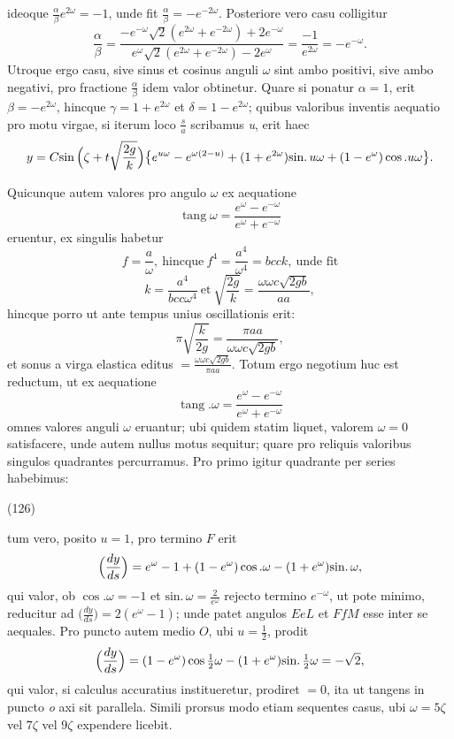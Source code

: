 \documentclass[11pt,a4paper]{article}
\begin{document}
ideoque $\frac{\alpha}{\beta}e^{2\omega} = -1$, unde fit $\frac{\alpha}{\beta} = -e^{-2\omega}$.
Posteriore vero casu colligitur
\[
\frac{\alpha}{\beta} = \frac{-e^{-\omega}\sqrt{2}(e^{2\omega} + e^{-2\omega}) + 2e^{-\omega}}{e^\omega\sqrt{2}(e^{2\omega} + e^{-2\omega}) - 2e^\omega} = \frac{-1}{e^{2\omega}} = -e^{-\omega}.
\]
Utroque ergo casu, sive sinus et cosinus anguli \emph{$\omega$} sint ambo positivi,
sive ambo negativi, pro fractione $\frac{\alpha}{\beta}$ idem valor obtinetur. Quare
si ponatur $\alpha = 1$, erit $\beta = -e^{2\omega}$, hincque $\gamma = 1 + e^{2\omega}$
et $\delta = 1 - e^{2\omega}$; quibus valoribus inventis aequatio pro motu virgae, si
iterum loco $\frac{s}{a}$ scribamus \emph{u}, erit haec
\[
y = C\text{sin}\,\Bigl(\zeta + t\sqrt{\frac{2g}{k}}\Bigr)\bigl\{e^{u\omega} - e^{\omega(2-u)} + (1 + e^{2\omega})\text{sin.}\,u\omega + (1 - e^\omega)\cos.u\omega\bigr\}.
\]

Quicunque autem valores pro angulo $\omega$ ex aequatione
\[
\operatorname{tang}\omega = \frac{e^\omega - e^{-\omega}}{e^\omega + e^{-\omega}}
\]
eruentur, ex singulis habetur
\[
f = \frac{a}{\omega}, \ \text{hincque}\ f^4 = \frac{a^4}{\omega^4} = bcck, \ \text{unde fit}
\]
\[
k = \frac{a^4}{bcc\omega^4} \ \text{et}\ \sqrt{\frac{2g}{k}} = \frac{\omega\omega c\sqrt{2gb}}{aa},
\]
hincque porro ut ante tempus unius oscillationis erit:
\[
\pi\sqrt{\frac{k}{2g}} = \frac{\pi aa}{\omega\omega c\sqrt{2gb}},
\]
et sonus a virga elastica editus $= \frac{\omega\omega c\sqrt{2gb}}{\pi aa}$. Totum ergo
negotium huc est reductum, ut ex aequatione
\[
\operatorname{tang}.\omega = \frac{e^\omega - e^{-\omega}}{e^\omega + e^{-\omega}}
\]
omnes valores anguli $\omega$ eruantur; ubi quidem statim liquet, valorem
$\omega = 0$ satisfacere, unde autem nullus motus sequitur; quare pro reliquis
valoribus singulos quadrantes percurramus. Pro primo igitur quadrante per series
habebimus:

(126)

tum vero, posito $u = 1$, pro termino $F$ erit
\[
\Bigl(\frac{dy}{ds}\Bigr) = e^\omega - 1 + (1 - e^\omega)\cos.\omega - (1 + e^\omega)\text{sin.}\,\omega,
\]
qui valor, ob $\cos.\omega = -1$ et $\text{sin.}\,\omega = \frac{2}{e^\omega}$ rejecto termino
$e^{-\omega}$, ut pote minimo, reducitur ad $\bigl(\frac{dy}{ds}\bigr) = 2(e^\omega - 1)$;
unde patet angulos $EeL$ et $FfM$ esse inter se aequales. Pro puncto autem medio $O$,
ubi $u = \frac{1}{2}$, prodit
\[
\Bigl(\frac{dy}{ds}\Bigr) = (1 - e^\omega)\cos\tfrac{1}{2}\omega - (1 + e^\omega)\text{sin.}\,\tfrac{1}{2}\omega = -\sqrt{2},
\]
qui valor, si calculus accuratius institueretur, prodiret $= 0$, ita ut tangens in
puncto \emph{o} axi sit parallela. Simili prorsus modo etiam sequentes casus, ubi
$\omega = 5\zeta$ vel $7\zeta$ vel $9\zeta$ expendere licebit.
\end{document}
